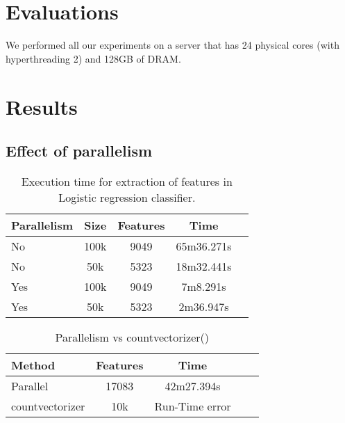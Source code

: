 \documentclass{article}
\begin{document}
\section{Evaluations}

We performed all our experiments on a server that has 24 physical cores (with hyperthreading 2) and 128GB of DRAM. 

\section{Results}

\subsection{Effect of parallelism}

\begin{table}[t]
\caption{Execution time for extraction of features in Logistic regression classifier.}
\label{sample-table}
\vskip 0.15in
\begin{center}
\begin{small}
\begin{sc}
\begin{tabular}{lcccr}
\hline
\abovespace
Parallelism & Size & Features & Time \\
\hline
\abovespace
No  & 100k & 9049 & 65m36.271s \\
No  & 50k & 5323 & 18m32.441s \\
Yes  & 100k & 9049 & 7m8.291s \\
Yes  & 50k & 5323 & 2m36.947s \\
\hline
\end{tabular}
\end{sc}
\end{small}
\end{center}
\vskip -0.1in
\end{table}




\begin{table}[t]
\caption{Parallelism vs countvectorizer()}
\label{sample-table}
\vskip 0.15in
\begin{center}
\begin{small}
\begin{sc}
\begin{tabular}{lcccr}
\hline
\abovespace
Method & Features & Time \\
\hline
\abovespace
Parallel  & 17083 & 42m27.394s \\
countvectorizer  & 10k & Run-Time error \\
\hline
\end{tabular}
\end{sc}
\end{small}
\end{center}
\vskip -0.1in
\end{table}




\nocite{langley00}



\end{document}
